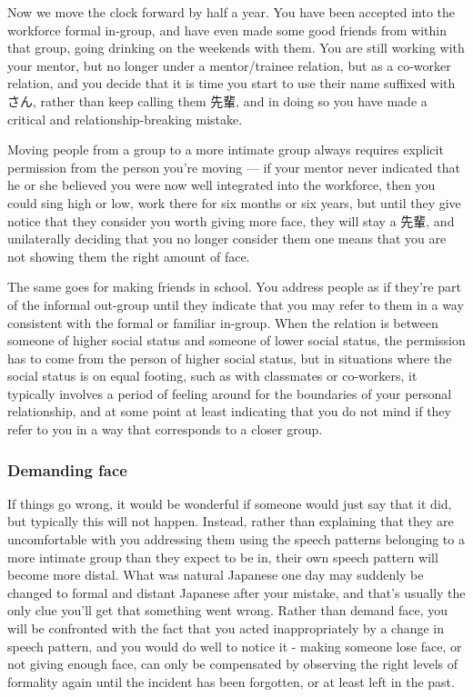 \documentclass[11pt, b5paper, twoside, openright, onecolumn]{book}
\begin{document}
Now we move the clock forward by half a year. You have been accepted into the workforce formal in-group‚ and have even made some good friends from within that group‚ going drinking on the weekends with them. You are still working with your mentor‚ but no longer under a mentor/trainee relation‚ but as a co-worker relation‚ and you decide that it is time you start to use their name suffixed with さん‚ rather than keep calling them 先輩‚ and in doing so you have made a critical and relationship-breaking mistake.

Moving people from a group to a more intimate group always requires explicit permission from the person you’re moving — if your mentor never indicated that he or she believed you were now well integrated into the workforce‚ then you could sing high or low‚ work there for six months or six years‚ but until they give notice that they consider you worth giving more face‚ they will stay a 先輩‚ and unilaterally deciding that you no longer consider them one means that you are not showing them the right amount of face.

The same goes for making friends in school. You address people as if they’re part of the informal out-group until they indicate that you may refer to them in a way consistent with the formal or familiar in-group. When the relation is between someone of higher social status and someone of lower social status‚ the permission has to come from the person of higher social status‚ but in situations where the social status is on equal footing‚ such as with classmates or co-workers‚ it typically involves a period of feeling around for the boundaries of your personal relationship‚ and at some point at least indicating that you do not mind if they refer to you in a way that corresponds to a closer group.

\subsubsection{Demanding face}

If things go wrong‚ it would be wonderful if someone would just say that it did‚ but typically this will not happen. Instead‚ rather than explaining that they are uncomfortable with you addressing them using the speech patterns belonging to a more intimate group than they expect to be in‚ their own speech pattern will become more distal. What was natural Japanese one day may suddenly be changed to formal and distant Japanese after your mistake‚ and that’s usually the only clue you’ll get that something went wrong. Rather than demand face‚ you will be confronted with the fact that you acted inappropriately by a change in speech pattern‚ and you would do well to notice it - making someone lose face‚ or not giving enough face‚ can only be compensated by observing the right levels of formality again until the incident has been forgotten‚ or at least left in the past.
\end{document}
